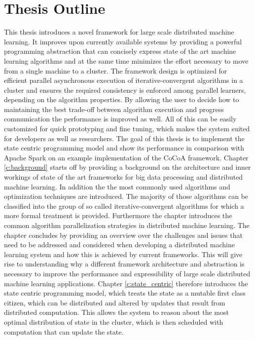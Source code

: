 \section{Thesis Outline}
This thesis introduces a novel framework for large scale distributed machine learning.
It improves upon currently available systems by providing a powerful programming abstraction that can concisely express state of the art machine learning algorithms and at the same time minimizes the effort necessary to move from a single machine to a cluster.
The framework design is optimized for efficient parallel asynchronous execution of iterative-convergent algorithms in a cluster and ensures the required consistency is enforced among parallel learners, depending on the algorithm properties. By allowing the user to decide how to maintaining the best trade-off between algorithm execution and progress communication the performance is improved as well.
All of this can be easily customized for quick prototyping and fine tuning, which makes the system suited for developers as well as researchers.
The goal of this thesis is to implement the state centric programming model and show its performance in comparison with Apache Spark on an example implementation of the CoCoA \cite{Jaggi2014} framework.
Chapter \ref{c:background} starts off by providing a background on the architecture and inner workings of state of the art frameworks for big data processing and distributed machine learning.
In addition the the most commonly used algorithms and optimization techniques are introduced.
The majority of those algorithms can be classified into the group of so called iterative-convergent algorithms for which a more formal treatment is provided.
Furthermore the chapter introduces the common algorithm parallelization strategies in distributed machine learning.
The chapter concludes by providing an overview over the challenges and issues that need to be addressed and considered when developing a distributed machine learning system and how this is achieved by current frameworks.
This will give rise to understanding why a different framework architecture and abstraction is necessary to improve the performance and expressibility of large scale distributed machine learning applications.
Chapter \ref{c:state_centric} therefore introduces the state centric programming model, which treats the state as a mutable first class citizen, which can be distributed and altered by updates that result from distributed computation.
This allows the system to reason about the most optimal distribution of state in the cluster, which is then scheduled with computation that can update the state.
